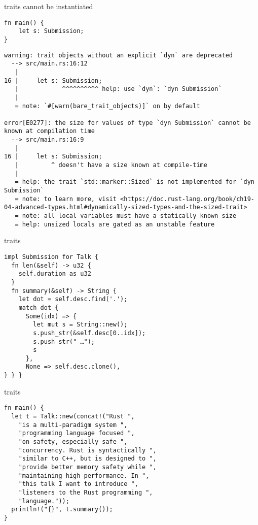 \documentclass{beamer}
\begin{document}
\begin{frame}[fragile]{traits cannot be instantiated}
  \begin{verbatim}
fn main() {
    let s: Submission;
}
  \end{verbatim}

  \begin{verbatim}
warning: trait objects without an explicit `dyn` are deprecated
  --> src/main.rs:16:12
   |
16 |     let s: Submission;
   |            ^^^^^^^^^^ help: use `dyn`: `dyn Submission`
   |
   = note: `#[warn(bare_trait_objects)]` on by default

error[E0277]: the size for values of type `dyn Submission` cannot be known at compilation time
  --> src/main.rs:16:9
   |
16 |     let s: Submission;
   |         ^ doesn't have a size known at compile-time
   |
   = help: the trait `std::marker::Sized` is not implemented for `dyn Submission`
   = note: to learn more, visit <https://doc.rust-lang.org/book/ch19-04-advanced-types.html#dynamically-sized-types-and-the-sized-trait>
   = note: all local variables must have a statically known size
   = help: unsized locals are gated as an unstable feature
   \end{verbatim}
\end{frame}

\begin{frame}[fragile]{traits}
  \begin{verbatim}
impl Submission for Talk {
  fn len(&self) -> u32 {
    self.duration as u32
  }
  fn summary(&self) -> String {
    let dot = self.desc.find('.');
    match dot {
      Some(idx) => {
        let mut s = String::new();
        s.push_str(&self.desc[0..idx]);
        s.push_str(" …");
        s
      },
      None => self.desc.clone(),
} } }
  \end{verbatim}
\end{frame}

\begin{frame}[fragile]{traits}
  \begin{verbatim}
fn main() {
  let t = Talk::new(concat!("Rust ",
    "is a multi-paradigm system ",
    "programming language focused ",
    "on safety, especially safe ",
    "concurrency. Rust is syntactically ",
    "similar to C++, but is designed to ",
    "provide better memory safety while ",
    "maintaining high performance. In ",
    "this talk I want to introduce ",
    "listeners to the Rust programming ",
    "language."));
  println!("{}", t.summary());
}
  \end{verbatim}
\end{frame}
\end{document}
